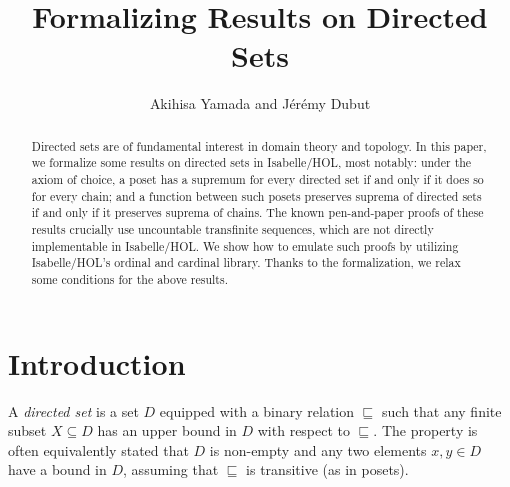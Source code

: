 \documentclass[11pt,a4paper]{article}
\newcommand\LE{\sqsubseteq}
\begin{document}
\title{Formalizing Results on Directed Sets}
\author{Akihisa Yamada and J\'er\'emy Dubut}
\maketitle

\begin{abstract}
Directed sets are of fundamental interest in domain theory and topology.
In this paper, we formalize some results on directed sets in Isabelle/HOL, most notably: under the axiom of choice,
a poset has a supremum for every directed set if and only if it does so for every chain;
and a function between such posets preserves suprema of directed sets if and only if it preserves suprema of chains.
The known pen-and-paper proofs of these results crucially use uncountable transfinite sequences, which are not directly implementable in Isabelle/HOL.
We show how to emulate such proofs by utilizing Isabelle/HOL's ordinal and cardinal library.
Thanks to the formalization, we relax some conditions for the above results.
\end{abstract}

\tableofcontents

\section{Introduction}

A \emph{directed set} is a set $D$ equipped with a binary relation $\LE$ such that any finite subset $X \subseteq D$ has an upper bound in $D$ with respect to $\LE$.
The property is often equivalently stated that $D$ is non-empty and any two elements $x,y \in D$ have a bound in $D$,
assuming that $\LE$ is transitive (as in posets).
\end{document}
